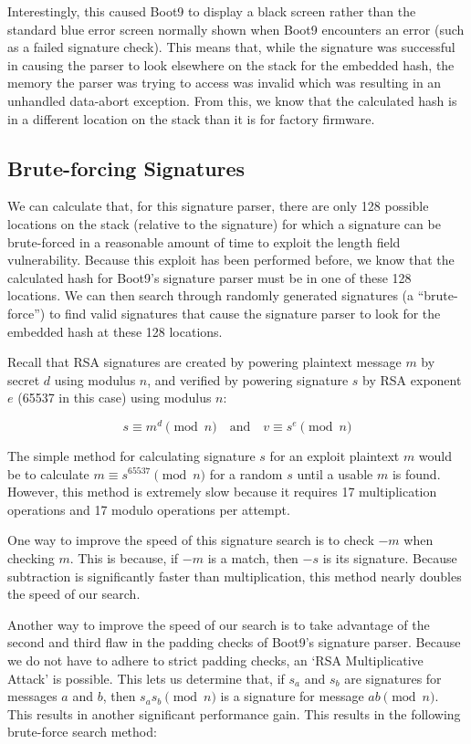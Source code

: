 \documentclass[journal]{IEEEtran}
\begin{document}
Interestingly, this caused Boot9 to display a black screen rather than the
standard blue error screen normally shown when Boot9 encounters an error (such
as a failed signature check). This means that, while the signature was
successful in causing the parser to look elsewhere on the stack for the embedded
hash, the memory the parser was trying to access was invalid which was resulting
in an unhandled data-abort exception. From this, we know that the calculated
hash is in a different location on the stack than it is for factory firmware.

\subsection{Brute-forcing Signatures}

We can calculate that, for this signature parser, there are only 128 possible
locations on the stack (relative to the signature) for which a signature can be
brute-forced in a reasonable amount of time to exploit the length field
vulnerability. Because this exploit has been performed before, we know that the
calculated hash for Boot9's signature parser must be in one of these 128
locations. We can then search through randomly generated signatures (a
``brute-force'') to find valid signatures that cause the signature parser to
look for the embedded hash at these 128 locations.

Recall that RSA signatures are created by powering plaintext message \(m\) by
secret \(d\) using modulus \(n\), and verified by powering signature \(s\) by
RSA exponent \(e\) (65537 in this case) using modulus \(n\):

\[s \equiv m^{d} \pmod{n} \quad \text{and} \quad v \equiv s^{e} \pmod{n}\]

The simple method for calculating signature \(s\) for an exploit plaintext
\(m\) would be to calculate \(m \equiv s^{65537} \pmod{n}\) for a random \(s\)
until a usable \(m\) is found. However, this method is extremely slow because it
requires 17 multiplication operations and 17 modulo operations per attempt.

One way to improve the speed of this signature search is to check \(-m\) when
checking \(m\). This is because, if \(-m\) is a match, then \(-s\) is its
signature. Because subtraction is significantly faster than multiplication, this
method nearly doubles the speed of our search.

Another way to improve the speed of our search is to take advantage of the
second and third flaw in the padding checks of Boot9's signature parser. Because
we do not have to adhere to strict padding checks, an `RSA Multiplicative
Attack' is possible. This lets us determine that, if \(s_{a}\) and \(s_{b}\) are
signatures for messages \(a\) and \(b\), then \(s_{a}s_{b} \pmod{n}\) is a
signature for message \(ab \pmod{n}\). This results in another significant
performance gain. This results in the following brute-force search method:
\end{document}
